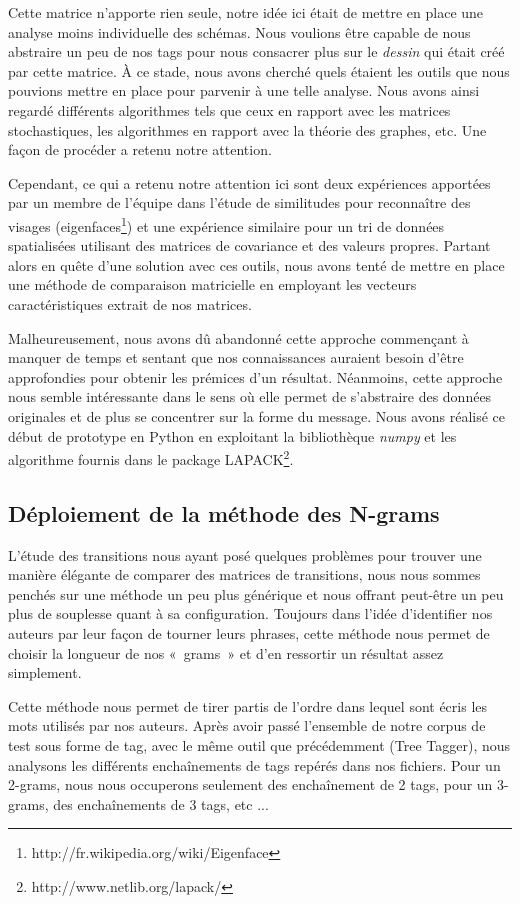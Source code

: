 \documentclass[a4paper,12pt]{report}
\begin{document}
Cette matrice n'apporte rien seule, notre idée ici était de mettre en place une analyse moins individuelle des schémas. Nous voulions être capable de nous abstraire un peu de nos tags pour nous consacrer plus sur le \textit{dessin} qui était créé par cette matrice. À ce stade, nous avons cherché quels étaient les outils que nous pouvions mettre en place pour parvenir à une telle analyse. Nous avons ainsi regardé différents algorithmes tels que ceux en rapport avec les matrices stochastiques, les algorithmes en rapport avec la théorie des graphes, etc. Une façon de procéder a retenu notre attention.

Cependant, ce qui a retenu notre attention ici sont deux expériences apportées par un membre de l'équipe dans l'étude de similitudes pour reconnaître des visages (eigenfaces\footnote{http://fr.wikipedia.org/wiki/Eigenface}) et une expérience similaire pour un tri de données spatialisées utilisant des matrices de covariance et des valeurs propres. Partant alors en quête d'une solution avec ces outils, nous avons tenté de mettre en place une méthode de comparaison matricielle en employant les vecteurs caractéristiques extrait de nos matrices.

Malheureusement, nous avons dû abandonné cette approche commençant à manquer de temps et sentant que nos connaissances auraient besoin d'être approfondies pour obtenir les prémices d'un résultat. Néanmoins, cette approche nous semble intéressante dans le sens où elle permet de s'abstraire des données originales et de plus se concentrer sur la forme du message. Nous avons réalisé ce début de prototype en Python en exploitant la bibliothèque \textit{numpy} et les algorithme fournis dans le package LAPACK\footnote{http://www.netlib.org/lapack/}.

\subsection{Déploiement de la méthode des N-grams}

L'étude des transitions nous ayant posé quelques problèmes pour trouver une manière élégante de comparer des matrices de transitions, nous nous sommes penchés sur une méthode un peu plus générique et nous offrant peut-être un peu plus de souplesse quant à sa configuration. Toujours dans l'idée d'identifier nos auteurs par leur façon de tourner leurs phrases, cette méthode nous permet de choisir la longueur de nos «~grams~» et d'en ressortir un résultat assez simplement.

Cette méthode nous permet de tirer partis de l'ordre dans lequel sont écris les mots utilisés par nos auteurs. Après avoir passé l'ensemble de notre corpus de test sous forme de tag, avec le même outil que précédemment (Tree Tagger), nous analysons les différents enchaînements de tags repérés dans nos fichiers. Pour un 2-grams, nous nous occuperons seulement des enchaînement de 2 tags, pour un 3-grams, des enchaînements de 3 tags, etc ...
\end{document}
